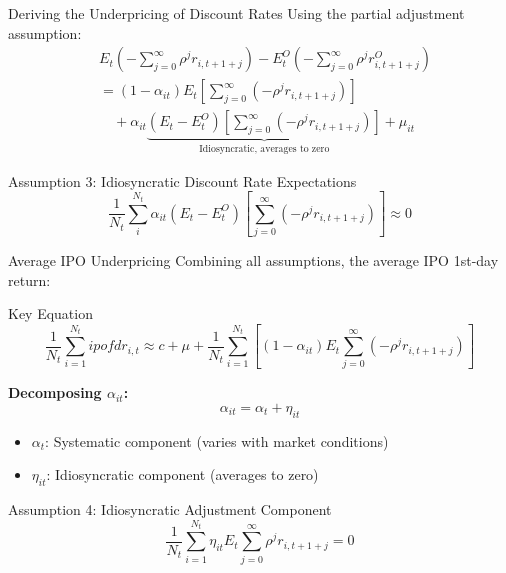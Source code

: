 \documentclass{beamer}
\begin{document}
\begin{frame}[allowframebreaks]{Deriving the Underpricing of Discount Rates}
Using the partial adjustment assumption:
\begin{align*}
&E_t\left(-\sum_{j=0}^{\infty}\rho^j r_{i,t+1+j}\right) - E_t^O\left(-\sum_{j=0}^{\infty}\rho^j r_{i,t+1+j}^O\right) \\[10pt]
&= (1-\alpha_{it})E_t\left[\sum_{j=0}^{\infty}(-\rho^j r_{i,t+1+j})\right] \\[8pt]
&\quad + \alpha_{it}\underbrace{\left(E_t - E_t^O\right)\left[\sum_{j=0}^{\infty}(-\rho^j r_{i,t+1+j})\right]}_{\text{Idiosyncratic, averages to zero}} + \mu_{it}
\end{align*}

\framebreak
\begin{block}{Assumption 3: Idiosyncratic Discount Rate Expectations}
\[
\frac{1}{N_t}\sum_{i}^{N_t}\alpha_{it}\left(E_t - E_t^O\right)\left[\sum_{j=0}^{\infty}(-\rho^j r_{i,t+1+j})\right] \approx 0
\]
\end{block}
\end{frame}

\begin{frame}[allowframebreaks]{Average IPO Underpricing}
Combining all assumptions, the average IPO 1st-day return:
\begin{block}{Key Equation}
\[
\frac{1}{N_t}\sum_{i=1}^{N_t}ipofdr_{i,t} \approx c + \mu + \frac{1}{N_t}\sum_{i=1}^{N_t}\left[(1-\alpha_{it})E_t\sum_{j=0}^{\infty}(-\rho^j r_{i,t+1+j})\right]
\]
\end{block}

\textbf{Decomposing $\alpha_{it}$:}
\[
\alpha_{it} = \alpha_t + \eta_{it}
\]
\begin{itemize}
    \item $\alpha_t$: Systematic component (varies with market conditions)
    \item $\eta_{it}$: Idiosyncratic component (averages to zero)
\end{itemize}
\framebreak
\begin{block}{Assumption 4: Idiosyncratic Adjustment Component}
\[
\frac{1}{N_t}\sum_{i=1}^{N_t}\eta_{it}E_t\sum_{j=0}^{\infty}\rho^j r_{i,t+1+j} = 0
\]
\end{block}
\end{frame}
\end{document}
